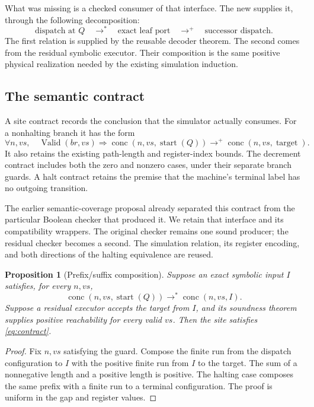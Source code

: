 \documentclass[11pt,letterpaper]{article}
\newtheorem{proposition}[theorem]{Proposition}
\newcommand{\code}[1]{\texttt{\small\detokenize{#1}}}
\newcommand{\Reach}{\mathrel{\longrightarrow^{*}}}
\newcommand{\ReachPlus}{\mathrel{\longrightarrow^{+}}}
\begin{document}
What was missing is a checked consumer of that interface. The new
\code{KResidual215.lean} supplies it, through the following decomposition:
\[
\text{dispatch at }Q\quad\Reach\quad
\text{exact leaf port}\quad\ReachPlus\quad
\text{successor dispatch}.
\]
The first relation is supplied by the reusable decoder theorem. The second
comes from the residual symbolic executor. Their composition is the same
positive physical realization needed by the existing simulation induction.

\subsection{The semantic contract}

A site contract records the conclusion that the simulator actually consumes.
For a nonhalting branch it has the form
\begin{equation}\label{eq:contract}
\forall n,vs,\quad
\operatorname{Valid}(br,vs)\Longrightarrow
\operatorname{conc}(n,vs,\operatorname{start}(Q))
\ReachPlus
\operatorname{conc}(n,vs,\operatorname{target}).
\end{equation}
It also retains the existing path-length and register-index bounds. The
decrement contract includes both the zero and nonzero cases, under their
separate branch guards. A halt contract retains the premise that the machine's
terminal label has no outgoing transition.

The earlier semantic-coverage proposal already separated this contract from
the particular Boolean checker that produced it. We retain that interface and
its compatibility wrappers. The original checker remains one sound producer;
the residual checker becomes a second. The simulation relation, its register
encoding, and both directions of the halting equivalence are reused.

\begin{proposition}[Prefix/suffix composition]
Suppose an exact symbolic input $I$ satisfies, for every $n,vs$,
\[
\operatorname{conc}(n,vs,\operatorname{start}(Q))
\Reach\operatorname{conc}(n,vs,I).
\]
Suppose a residual executor accepts the target from $I$, and its soundness
theorem supplies positive reachability for every valid $vs$. Then
the site satisfies \eqref{eq:contract}.
\end{proposition}

\begin{proof}
Fix $n,vs$ satisfying the guard. Compose the finite run from the dispatch
configuration to $I$ with the positive finite run from $I$ to the target.
The sum of a nonnegative length and a positive length is positive. The
halting case composes the same prefix with a finite run to a terminal
configuration. The proof is uniform in the gap and register values.
\end{proof}
\end{document}
